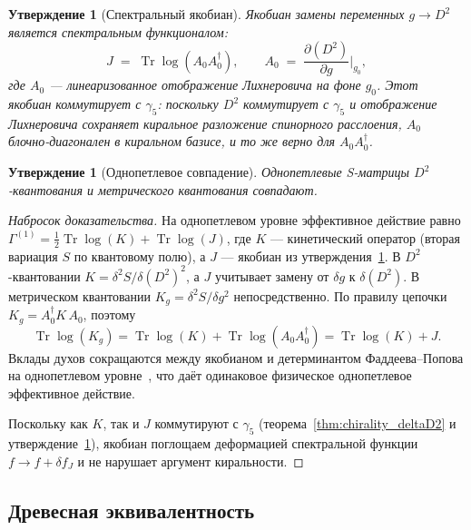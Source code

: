 \documentclass[12pt,a4paper]{article}
\newtheorem{proposition}[theorem]{Утверждение}
\theoremstyle{definition}
\theoremstyle{remark}
\newcommand{\Tr}{\operatorname{Tr}}
\newcommand{\half}{\tfrac{1}{2}}
\begin{document}
\begin{proposition}[Спектральный якобиан]
\label{prop:jacobian}
Якобиан замены переменных $g \to D^2$ является спектральным
функционалом:
\begin{equation}
  J \;=\; \Tr\log(A_0 A_0^\dagger),
  \qquad
  A_0 \;=\; \frac{\partial(D^2)}{\partial g}\bigg|_{g_0},
\end{equation}
где $A_0$ --- линеаризованное отображение Лихнеровича на фоне $g_0$.
Этот якобиан коммутирует с $\gamma_5$: поскольку $D^2$ коммутирует
с $\gamma_5$ и отображение Лихнеровича сохраняет киральное разложение
спинорного расслоения, $A_0$ блочно-диагонален в киральном базисе, и то
же верно для $A_0 A_0^\dagger$.
\end{proposition}

\begin{proposition}[Однопетлевое совпадение]
\label{prop:oneloop}
Однопетлевые S-матрицы $D^2$-квантования и метрического квантования
совпадают.
\end{proposition}

\begin{proof}[Набросок доказательства]
На однопетлевом уровне эффективное действие равно
$\Gamma^{(1)} = \half\Tr\log(K) + \Tr\log(J)$,
где $K$ --- кинетический оператор (вторая вариация $S$ по квантовому
полю), а $J$ --- якобиан из утверждения~\ref{prop:jacobian}.
В $D^2$-квантовании $K = \delta^2 S / \delta(D^2)^2$, а $J$ учитывает
замену от $\delta g$ к $\delta(D^2)$.  В метрическом квантовании
$K_g = \delta^2 S / \delta g^2$ непосредственно.  По правилу цепочки
$K_g = A_0^\dagger K\, A_0$, поэтому
\begin{equation}
  \Tr\log(K_g) = \Tr\log(K) + \Tr\log(A_0 A_0^\dagger) = \Tr\log(K) + J.
\end{equation}
Вклады духов сокращаются между якобианом и детерминантом
Фаддеева--Попова на однопетлевом уровне~\cite{Bastianelli:2006rx},
что даёт одинаковое физическое однопетлевое эффективное действие.

Поскольку как $K$, так и $J$ коммутируют с $\gamma_5$
(теорема~\ref{thm:chirality_deltaD2} и
утверждение~\ref{prop:jacobian}), якобиан поглощаем деформацией
спектральной функции $f \to f + \delta f_J$ и не нарушает аргумент
киральности.
\end{proof}

\subsection{Древесная эквивалентность}
\end{document}
